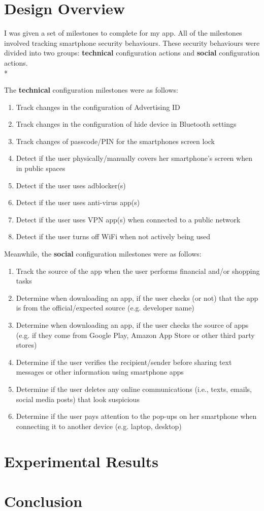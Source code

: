 \documentclass[12pt,twoside]{report}
\begin{document}
\chapter{Design Overview}

I was given a set of milestones to complete for my app. All of the milestones involved tracking smartphone security behaviours. These security behaviours were divided into two groups: \textbf{technical} configuration actions and \textbf{social} configuration actions.\\*

The \textbf{technical} configuration milestones were as follows:

\begin{enumerate}[label=1.\arabic*]
  \item Track changes in the configuration of Advertising ID
  \item Track changes in the configuration of hide device in Bluetooth settings
  \item Track changes of passcode/PIN for the smartphones screen lock
  \item Detect if the user physically/manually covers her smartphone’s screen when in public spaces
  \item Detect if the user uses adblocker(s)
  \item Detect if the user uses anti-virus app(s)
  \item Detect if the user uses VPN app(s) when connected to a public network
  \item Detect if the user turns off WiFi when not actively being used
\end{enumerate}

Meanwhile, the \textbf{social} configuration milestones were as follows:

\begin{enumerate}[label=2.\arabic*]
    \item Track the source of the app when the user performs financial and/or shopping tasks
    \item Determine when downloading an app, if the user checks (or not) that the app is from the official/expected source (e.g. developer name)
    \item Determine when downloading an app, if the user checks the source of apps (e.g. if they come from Google Play, Amazon App Store or other third party stores)
    \item Determine if the user verifies the recipient/sender before sharing text messages or other information using smartphone apps
    \item Determine if the user deletes any online communications (i.e., texts, emails, social media posts) that look suspicious
    \item Determine if the user pays attention to the pop-ups on her smartphone when connecting it to another device (e.g. laptop, desktop)
\end{enumerate}
\chapter{Experimental Results}


\chapter{Conclusion}



\end{document}
